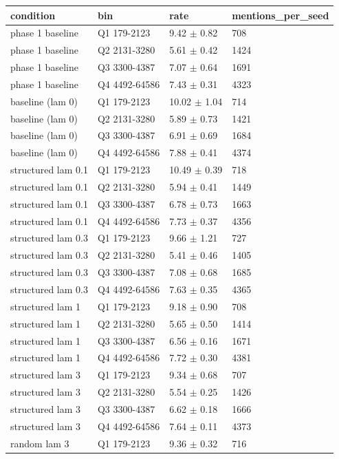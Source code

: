 \begin{tabular}{llll}
\hline
condition & bin & rate & mentions\_per\_seed \\
\hline
phase 1 baseline & Q1 179-2123 & 9.42 $\pm$ 0.82 & 708 \\
phase 1 baseline & Q2 2131-3280 & 5.61 $\pm$ 0.42 & 1424 \\
phase 1 baseline & Q3 3300-4387 & 7.07 $\pm$ 0.64 & 1691 \\
phase 1 baseline & Q4 4492-64586 & 7.43 $\pm$ 0.31 & 4323 \\
baseline (lam 0) & Q1 179-2123 & 10.02 $\pm$ 1.04 & 714 \\
baseline (lam 0) & Q2 2131-3280 & 5.89 $\pm$ 0.73 & 1421 \\
baseline (lam 0) & Q3 3300-4387 & 6.91 $\pm$ 0.69 & 1684 \\
baseline (lam 0) & Q4 4492-64586 & 7.88 $\pm$ 0.41 & 4374 \\
structured lam 0.1 & Q1 179-2123 & 10.49 $\pm$ 0.39 & 718 \\
structured lam 0.1 & Q2 2131-3280 & 5.94 $\pm$ 0.41 & 1449 \\
structured lam 0.1 & Q3 3300-4387 & 6.78 $\pm$ 0.73 & 1663 \\
structured lam 0.1 & Q4 4492-64586 & 7.73 $\pm$ 0.37 & 4356 \\
structured lam 0.3 & Q1 179-2123 & 9.66 $\pm$ 1.21 & 727 \\
structured lam 0.3 & Q2 2131-3280 & 5.41 $\pm$ 0.46 & 1405 \\
structured lam 0.3 & Q3 3300-4387 & 7.08 $\pm$ 0.68 & 1685 \\
structured lam 0.3 & Q4 4492-64586 & 7.63 $\pm$ 0.35 & 4365 \\
structured lam 1 & Q1 179-2123 & 9.18 $\pm$ 0.90 & 708 \\
structured lam 1 & Q2 2131-3280 & 5.65 $\pm$ 0.50 & 1414 \\
structured lam 1 & Q3 3300-4387 & 6.56 $\pm$ 0.16 & 1671 \\
structured lam 1 & Q4 4492-64586 & 7.72 $\pm$ 0.30 & 4381 \\
structured lam 3 & Q1 179-2123 & 9.34 $\pm$ 0.68 & 707 \\
structured lam 3 & Q2 2131-3280 & 5.54 $\pm$ 0.25 & 1426 \\
structured lam 3 & Q3 3300-4387 & 6.62 $\pm$ 0.18 & 1666 \\
structured lam 3 & Q4 4492-64586 & 7.64 $\pm$ 0.11 & 4373 \\
random lam 3 & Q1 179-2123 & 9.36 $\pm$ 0.32 & 716 \\

\end{tabular}
